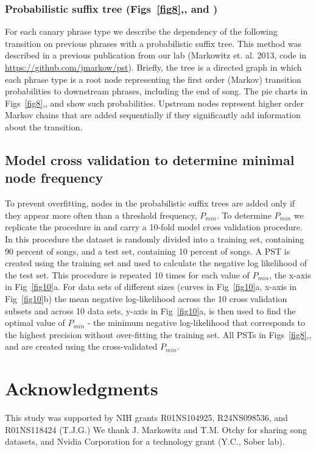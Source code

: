 \documentclass[10pt,letterpaper]{article}
\begin{document}
\subsubsection*{Probabilistic suffix tree (Figs~\ref{fig8},, and )}
For each canary phrase type we describe the dependency of the following transition on previous phrases with a probabilistic suffix tree. This method was described in a previous publication from our lab (Markowitz et. al. 2013, code in \url{https://github.com/jmarkow/pst}). Briefly, the tree is a directed graph in which each phrase type is a root node representing the first order (Markov) transition probabilities to downstream phrases, including the end of song. The pie charts in Figs~\ref{fig8},, and  show such probabilities. Upstream nodes represent higher order Markov chains that are added sequentially if they significantly add information about the transition.
\subsection*{Model cross validation to determine minimal node frequency}
To prevent overfitting, nodes in the probabilistic suffix trees are added only if they appear more often than a threshold frequency, $P_{min}$. To determine $P_{min}$ we replicate the procedure in \cite{markowitz_long-range_2013} and carry a 10-fold model cross validation procedure. In this procedure the dataset is randomly divided into a training set, containing 90 percent of songs, and a test set, containing 10 percent of songs. A PST is created using the training set and used to calculate the negative log likelihood of the test set. This procedure is repeated 10 times for each value of $P_{min}$, the x-axis in Fig~\ref{fig10}a. For data sets of different sizes (curves in Fig~\ref{fig10}a, x-axis in Fig~\ref{fig10}b) the mean negative log-likelihood across the 10 cross validation subsets and across 10 data sets, y-axis in Fig~\ref{fig10}a, is then used to find the optimal value of $P_{min}$ - the minimum negative log-likelihood that corresponds to the highest precision without over-fitting the training set. All PSTs in Figs~\ref{fig8},, and  are created using the cross-validated $P_{min}$.

\section*{Acknowledgments}
This study was supported by NIH grants R01NS104925,
R24NS098536, and R01NS118424 (T.J.G.) We thank J. Markowitz and T.M. Otchy for sharing song datasets, and Nvidia Corporation for a technology grant (Y.C., Sober lab).
\end{document}
